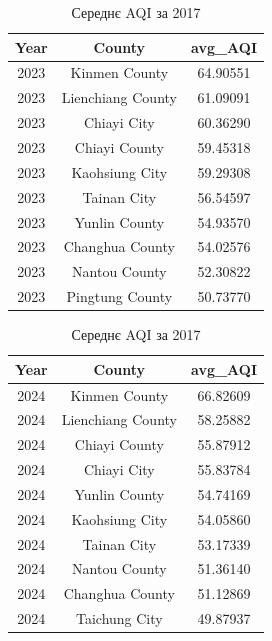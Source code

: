 \documentclass{article}
\begin{document}
\begin{enumerate}
    \begin{table}
        \centering
        \begin{minipage}{0.45\textwidth}
            \centering
            \begin{tabular}{ccc}
                \textbf{Year} & \textbf{County} & \textbf{avg\_AQI} \\
                \toprule
                2023&	Kinmen County	   &64.90551\\	
                2023&	Lienchiang County  &61.09091\\	
                2023&	Chiayi City	       &60.36290\\	
                2023&	Chiayi County	   &59.45318\\	
                2023&	Kaohsiung City	   &59.29308\\	
                2023&	Tainan City	       &56.54597\\	
                2023&	Yunlin County	   &54.93570\\	
                2023&	Changhua County	   &54.02576\\	
                2023&	Nantou County	   &52.30822\\	
                2023&	Pingtung County	   &50.73770\\
                \midrule
            \end{tabular}
            \caption{Середнє AQI за 2016}
        \end{minipage}
        \hspace{0.05\textwidth} %
        \begin{minipage}{0.45\textwidth}
            \centering
            \begin{tabular}{ccc}
                \textbf{Year} & \textbf{County} & \textbf{avg\_AQI} \\
                \toprule
                2024&	Kinmen County	   &66.82609	\\	
                2024&	Lienchiang County  &58.25882	\\	
                2024&	Chiayi County	   &55.87912	\\	
                2024&	Chiayi City	       &55.83784	\\	
                2024&	Yunlin County	   &54.74169	\\	
                2024&	Kaohsiung City	   &54.05860	\\	
                2024&	Tainan City	       &53.17339	\\	
                2024&	Nantou County	   &51.36140	\\	
                2024&	Changhua County	   &51.12869	\\	
                2024&	Taichung City	   &49.87937	\\
                \midrule
            \end{tabular}
            \caption{Середнє AQI за 2017}
        \end{minipage}
    \end{table}
    

\end{enumerate}
\end{document}
